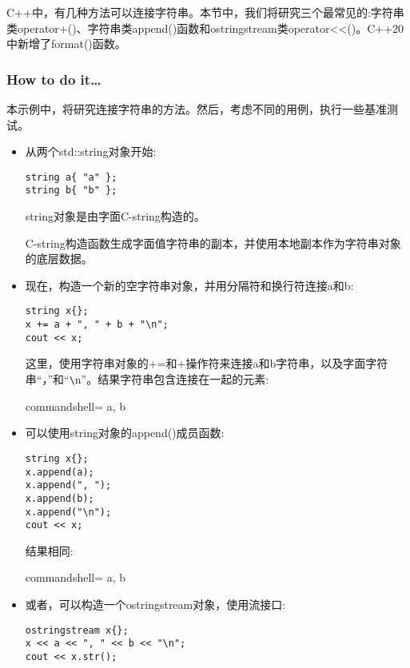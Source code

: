 
C++中，有几种方法可以连接字符串。本节中，我们将研究三个最常见的:字符串类operator+()、字符串类append()函数和ostringstream类operator<{}<()。C++20中新增了format()函数。

\subsubsection{How to do it…}

本示例中，将研究连接字符串的方法。然后，考虑不同的用例，执行一些基准测试。

\begin{itemize}
\item 
从两个std::string对象开始:

\begin{lstlisting}[style=styleCXX]
string a{ "a" };
string b{ "b" };
\end{lstlisting}

string对象是由字面C-string构造的。

C-string构造函数生成字面值字符串的副本，并使用本地副本作为字符串对象的底层数据。

\item 
现在，构造一个新的空字符串对象，并用分隔符和换行符连接a和b:

\begin{lstlisting}[style=styleCXX]
string x{};
x += a + ", " + b + "\n";
cout << x;
\end{lstlisting}

这里，使用字符串对象的+=和+操作符来连接a和b字符串，以及字面字符串“，”和“\verb|\|n”。结果字符串包含连接在一起的元素:

\begin{tcblisting}{commandshell={}}
a, b
\end{tcblisting}

\item 
可以使用string对象的append()成员函数:

\begin{lstlisting}[style=styleCXX]
string x{};
x.append(a);
x.append(", ");
x.append(b);
x.append("\n");
cout << x;
\end{lstlisting}

结果相同:

\begin{tcblisting}{commandshell={}}
a, b
\end{tcblisting}

\item 
或者，可以构造一个ostringstream对象，使用流接口:

\begin{lstlisting}[style=styleCXX]
ostringstream x{};
x << a << ", " << b << "\n";
cout << x.str();
\end{lstlisting}


\end{itemize}
